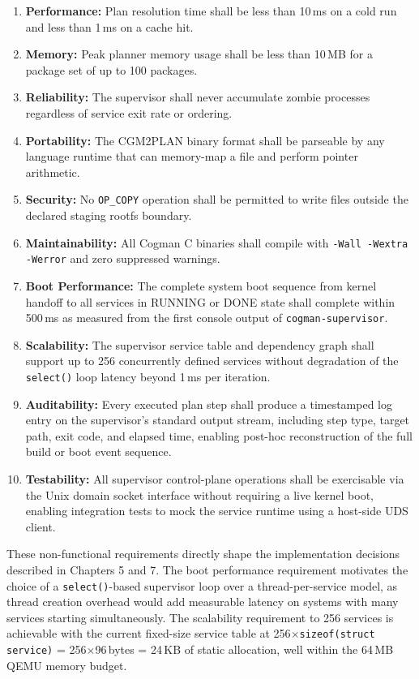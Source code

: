 \documentclass[12pt,a4paper]{report}
\begin{document}
\begin{enumerate}[leftmargin=2em, itemsep=3pt]
  \item \textbf{Performance:} Plan resolution time shall be less than 10\,ms on
        a cold run and less than 1\,ms on a cache hit.
  \item \textbf{Memory:} Peak planner memory usage shall be less than 10\,MB for
        a package set of up to 100 packages.
  \item \textbf{Reliability:} The supervisor shall never accumulate zombie
        processes regardless of service exit rate or ordering.
  \item \textbf{Portability:} The CGM2PLAN binary format shall be parseable by
        any language runtime that can memory-map a file and perform pointer
        arithmetic.
  \item \textbf{Security:} No \texttt{OP\_COPY} operation shall be permitted to
        write files outside the declared staging rootfs boundary.
  \item \textbf{Maintainability:} All Cogman C binaries shall compile with
        \texttt{-Wall -Wextra -Werror} and zero suppressed warnings.
  \item \textbf{Boot Performance:} The complete system boot sequence from kernel
        handoff to all services in RUNNING or DONE state shall complete within
        500\,ms as measured from the first console output of
        \texttt{cogman-supervisor}.
  \item \textbf{Scalability:} The supervisor service table and dependency graph
        shall support up to 256 concurrently defined services without
        degradation of the \texttt{select()} loop latency beyond 1\,ms per
        iteration.
  \item \textbf{Auditability:} Every executed plan step shall produce a
        timestamped log entry on the supervisor's standard output stream,
        including step type, target path, exit code, and elapsed time, enabling
        post-hoc reconstruction of the full build or boot event sequence.
  \item \textbf{Testability:} All supervisor control-plane operations shall be
        exercisable via the Unix domain socket interface without requiring a
        live kernel boot, enabling integration tests to mock the service
        runtime using a host-side UDS client.
\end{enumerate}

These non-functional requirements directly shape the implementation decisions
described in Chapters 5 and 7. The boot performance requirement motivates the
choice of a \texttt{select()}-based supervisor loop over a thread-per-service
model, as thread creation overhead would add measurable latency on systems with
many services starting simultaneously. The scalability requirement to 256 services
is achievable with the current fixed-size service table at 256$\times$\texttt{sizeof(struct service)} = 256$\times$96\,bytes = 24\,KB of
static allocation, well within the 64\,MB QEMU memory budget.
\end{document}
